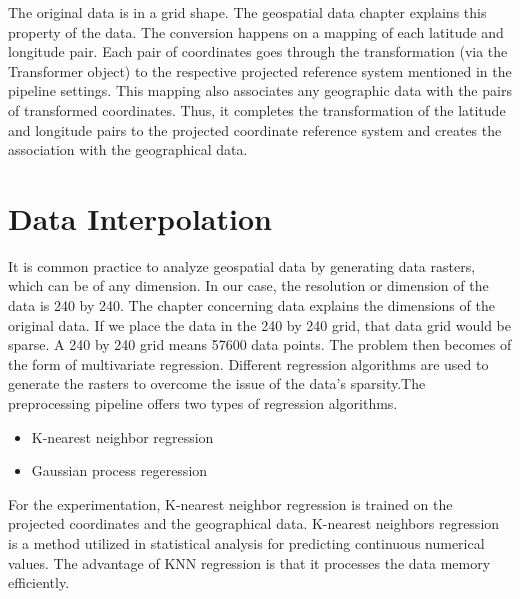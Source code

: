 The original data is in a grid shape. The geospatial data chapter explains this property of the data. The conversion happens on a mapping of each latitude and longitude pair. Each pair of coordinates goes through the transformation (via the Transformer object) to the respective projected reference system mentioned in the pipeline settings. This mapping also associates any geographic data with the pairs of transformed coordinates. Thus, it completes the transformation of the latitude and longitude pairs to the projected coordinate reference system and creates the association with the geographical data.


\section{Data Interpolation }
It is common practice to analyze geospatial data by generating data rasters, which can be of any dimension. In our case, the resolution or dimension of the data is 240 by 240. The chapter concerning data explains the dimensions of the original data. If we place the data in the 240 by 240 grid, that data grid would be sparse. A 240 by 240 grid means 57600 data points. The problem then becomes of the form of multivariate regression. Different regression algorithms are used to generate the rasters to overcome the issue of the data's sparsity.The preprocessing pipeline offers two types of regression algorithms.

\begin{itemize}
    \item K-nearest neighbor regression
    \item Gaussian process regeression
\end{itemize}
For the experimentation, K-nearest neighbor regression is trained on the projected coordinates and the geographical data. K-nearest neighbors regression is a method utilized in statistical analysis for predicting continuous numerical values. The advantage of KNN regression is that it processes the data memory efficiently.

